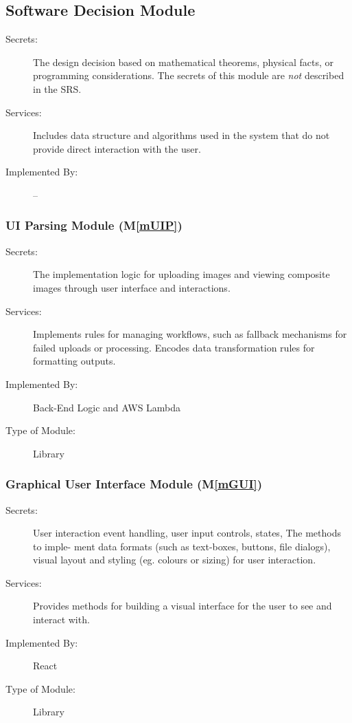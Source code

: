 \documentclass[12pt, titlepage]{article}
\newcommand{\mref}[1]{M\ref{#1}}
\begin{document}
\subsection{Software Decision Module}

\begin{description}
\item[Secrets:] The design decision based on mathematical theorems, physical
  facts, or programming considerations. The secrets of this module are
  \emph{not} described in the SRS.
\item[Services:] Includes data structure and algorithms used in the system that
  do not provide direct interaction with the user. 
\item[Implemented By:] --
\end{description}

\subsubsection{UI Parsing Module (\mref{mUIP})}

\begin{description}
\item[Secrets:]The implementation logic for uploading images and viewing composite images through user interface and interactions.
\item[Services:]Implements rules for managing workflows, such as fallback mechanisms for failed uploads or processing. Encodes data transformation rules for formatting outputs.
\item[Implemented By:] Back-End Logic and AWS Lambda
\item[Type of Module:] Library
\end{description}

\subsubsection{Graphical User Interface Module (\mref{mGUI})}

\begin{description}
\item[Secrets:]User interaction event handling, user input controls, states, The methods to imple- ment data formats (such as text-boxes, buttons, file dialogs), visual layout and styling (eg. colours or sizing) for user interaction.
\item[Services:]Provides methods for building a visual interface for the user to see and interact with.
\item[Implemented By:] React
\item[Type of Module:] Library
\end{description}
\end{document}

